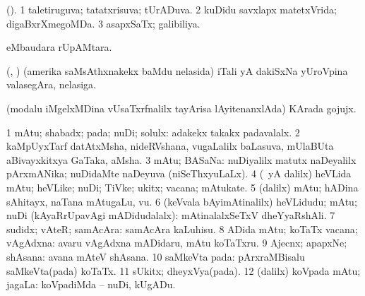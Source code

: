 \bentry
{} 
\gl{\gu}
\bmng
(\AmA). 
\bnum
\num{1} taletiruguva; tatatxrisuva; tUrADuva. 
\num{2} kuDidu savxlapx matetxVrida; digaBxrXmegoMDa. 
\num{3} asapxSaTx; galibiliya. 
\enum
\emng
\eentry

\bentry
{} 
\gl{\sakirx}
\expl{}
\bmng
{} eMbaudara rUpAMtara. 
\emng
\eentry

\bentry
{}
\gl{\nA}
\expl{}
\bmng
(\ashi, \hiV) (amerika saMsAthxnakekx baMdu nelasida) iTali yA dakiSxNa yUroVpina valasegAra, nelasiga. 
\emng
\eentry

\bentry
{} 
\gl{\nA}
\expl{}
\bmng
(modalu iMgelxMDina vUsaTxrfnalilx tayArisa lAyitenanxlAda) KArada gojujx. 
\emng
\eentry

\bentry 
{} 
\gl{\saMkiSx}
\expl{}
\bmng
{} 
\emng
\eentry

\bentry
{} 
\gl{\nA}
\expl{}
\bmng
\bnum
\num{1} mAtu; shabadx; pada; nuDi; solulx:  adakekx takakx padavalalx. 
\num{2} kaMpUyxTarf datAtxMsha, nideRVshana, \mo vugaLalilx baLasuva, mUlaBUta aBivayxkitxya GaTaka, aMsha. 
\num{3} mAtu; BASaNa:  nuDiyalilx matutx naDeyalilx pArxmANika; nuDidaMte naDeyuva (niSeThxyuLaLx). 
\num{4} (\bava\ yA \Eva dalilx) heVLida mAtu; heVLike; nuDi; TiVke; ukitx; vacana; mAtukate. 
\num{5} (\bava dalilx) mAtu; hADina sAhitayx, naTana mAtugaLu, \mo vu. 
\num{6} (keVvala bAyimAtinalilx) heVLidudu; mAtu; nuDi (kAyaRrUpavAgi mADidudalalx):  mAtinalalxSeTxV dheYyaRshAli. 
\num{7} sudidx; vAteR; samAcAra:  samAcAra kaLuhisu. 
\num{8} ADida mAtu; koTaTx vacana; vAgAdxna:  avaru vAgAdxna mADidaru, mAtu koTaTxru. 
\num{9} Ajecnx; apapxNe; shAsana:  avana mAteV shAsana. 
\num{10} saMkeVta pada:  pArxraMBisalu saMkeVta(pada) koTaTx. 
\num{11} sUkitx; dheyxVya(pada). 
\num{12} (\bava dalilx) koVpada mAtu; jagaLa:  koVpadiMda -- nuDi, kUgADu. 
\enum
\emng

